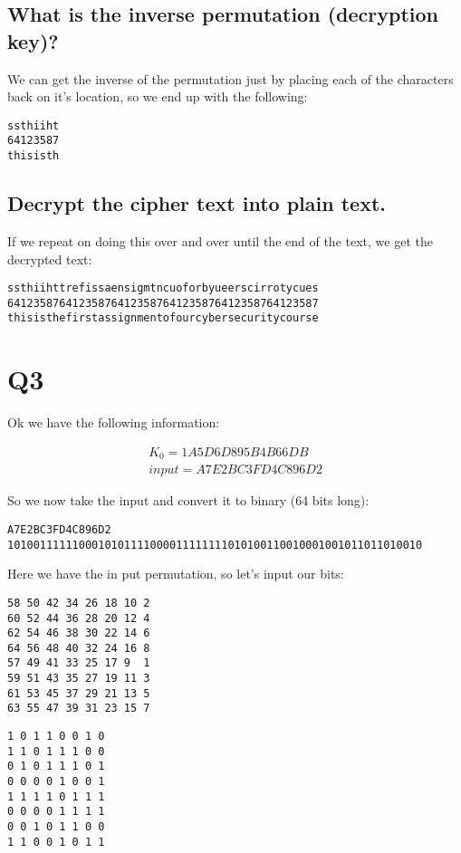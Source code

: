 \documentclass{article}
\begin{document}
\subsection{What is the inverse permutation (decryption key)?}
We can get the inverse of the permutation just by placing each of the characters back on it's location, so we end up with the following:
\begin{verbatim}
ssthiiht
64123587
thisisth
\end{verbatim}


\subsection{Decrypt the cipher text into plain text.}
If we repeat on doing this over and over until the end of the text, we get the decrypted text:
\begin{verbatim}
ssthiihttrefissaensigmtncuoforbyueerscirrotycues
641235876412358764123587641235876412358764123587
thisisthefirstassignmentofourcybersecuritycourse
\end{verbatim}

\section{Q3}


Ok we have the following information:

\begin{align}
	K_0 = 1A5D6D895B4B66DB \\
	input = A7E2BC3FD4C896D2
\end{align}


So we now take the input and convert it to binary (64 bits long):
\begin{verbatim}
A7E2BC3FD4C896D2
1010011111100010101111000011111111010100110010001001011011010010
\end{verbatim}


Here we have the in put permutation, so let's input our bits:
\begin{verbatim}
58 50 42 34 26 18 10 2
60 52 44 36 28 20 12 4
62 54 46 38 30 22 14 6
64 56 48 40 32 24 16 8
57 49 41 33 25 17 9  1
59 51 43 35 27 19 11 3
61 53 45 37 29 21 13 5
63 55 47 39 31 23 15 7
\end{verbatim}

\begin{verbatim}
1 0 1 1 0 0 1 0
1 1 0 1 1 1 0 0
0 1 0 1 1 1 0 1
0 0 0 0 1 0 0 1
1 1 1 1 0 1 1 1
0 0 0 0 1 1 1 1
0 0 1 0 1 1 0 0
1 1 0 0 1 0 1 1
\end{verbatim}
\end{document}
